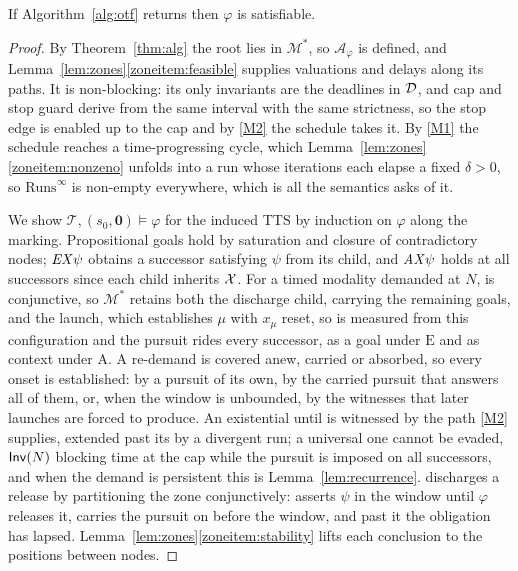 \begin{theorem}\label{thm:soundness}
If Algorithm~\ref{alg:otf} returns \SAT{} then $\varphi$ is satisfiable.%
\end{theorem}
\begin{proof}
By Theorem~\ref{thm:alg} the root lies in $\mathcal M^{*}$, so $\mathcal A_\varphi$ is defined, and
Lemma~\ref{lem:zones}\ref{zoneitem:feasible} supplies valuations and delays along its paths. It is non-blocking: its only
invariants are the deadlines in $\mathcal{D}$, and cap and stop guard derive from the same interval with the
same strictness, so the stop edge is enabled up to the cap and by \ref{M2} the schedule takes it. By
\ref{M1} the schedule reaches a time-progressing cycle, which Lemma~\ref{lem:zones}\ref{zoneitem:nonzeno} unfolds into
a run whose iterations each elapse a fixed $\delta>0$, so $\mathrm{Runs}^\infty$ is non-empty
everywhere, which is all the semantics asks of it.

We show $\mathcal T,(s_0,\mathbf 0)\models\varphi$ for the induced TTS by induction on $\varphi$
along the marking. Propositional goals hold by saturation and closure of contradictory nodes;
$\mathit{EX}\psi$ obtains a successor satisfying $\psi$ from its  child, and $\mathit{AX}\psi$ holds at
all successors since each child inherits $\mathcal{X}$. For a timed modality demanded at $N$,
 is conjunctive, so $\mathcal M^{*}$ retains both the discharge child, carrying the
remaining goals, and the launch, which establishes $\mu$ with $x_\mu$ reset, so \kI is measured
from this configuration and the pursuit rides every successor, as a goal under $\mathrm{E}$ and as
context under $\mathrm{A}$. A re-demand is covered anew, carried or absorbed, so every onset is established: by a pursuit
of its own, by the carried pursuit that answers all of them, or, when the window is unbounded, by
the witnesses that later launches are forced to produce. An existential until is witnessed by the path \ref{M2} supplies, extended past
its  by a divergent run; a universal one cannot be evaded, $\mathsf{Inv}(N)$ blocking time at
the cap while the pursuit is imposed on all successors, and when the demand is persistent this is
Lemma~\ref{lem:recurrence}.  discharges a release by partitioning the zone
conjunctively:  asserts $\psi$ in the window until $\varphi$ releases it, carries the
pursuit on before the window, and past it the obligation has lapsed.
Lemma~\ref{lem:zones}\ref{zoneitem:stability} lifts each conclusion to the positions between nodes.
\end{proof}